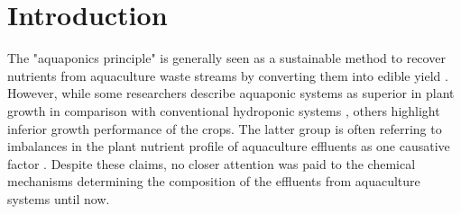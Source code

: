 \section{Introduction}
The "aquaponics principle" is generally seen as a sustainable method to recover nutrients from aquaculture waste streams by converting them into edible yield \parencite{Forchino2017}. However, while some researchers describe aquaponic systems as superior in plant growth in comparison with conventional hydroponic systems \parencite{Delaide2016}, others highlight inferior growth performance of the crops. The latter group is often referring to imbalances in the plant nutrient profile of aquaculture effluents as one causative factor \parencite{Seawright1998, Goddek2015}. Despite these claims, no closer attention was paid to the chemical mechanisms determining the composition of the effluents from aquaculture systems until now. 
